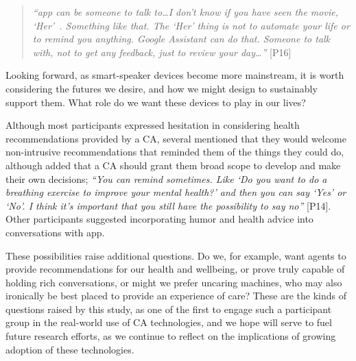         \begin{quote}
        \vspace{2mm}
            \textit{``\acl{app} can be someone to talk to\ldots I don't know if you have seen the movie, `Her'~\cite{spike2014her}. Something like that. The `Her' thing is not to automate your life or to remind you anything. Google Assistant can do that. Someone to talk with, not to get any feedback, just to review your day\ldots''} [P16]
        \vspace{2mm}
        \end{quote} 
    
        Looking forward, as smart-speaker devices become more mainstream, it is worth considering the futures we desire, and how we might design to sustainably support them. What role do we want these devices to play in our lives? 
        
        Although most participants expressed hesitation in considering health recommendations provided by a \ac{CA}, several mentioned that they would welcome non-intrusive recommendations that reminded them of the things they could do, although added that a \ac{CA} should grant them broad scope to develop and make their own decisions; \textit{``You can remind sometimes. Like `Do you want to do a breathing exercise to improve your mental health?' and then you can say `Yes' or `No'. I think it's important that you still have the possibility to say no''} [P14]. Other participants suggested incorporating humor and health advice into conversations with \acl{app}.
        
        These possibilities raise additional questions. Do we, for example, want agents to provide recommendations for our health and wellbeing, or prove truly capable of holding rich conversations, or might we prefer uncaring machines, who may also ironically be best placed to provide an experience of care? These are the kinds of questions raised by this study, as one of the first to engage such a participant group in the real-world use of \ac{CA} technologies, and we hope will serve to fuel future research efforts, as we continue to reflect on the implications of growing adoption of these technologies.
    
    
        
    
